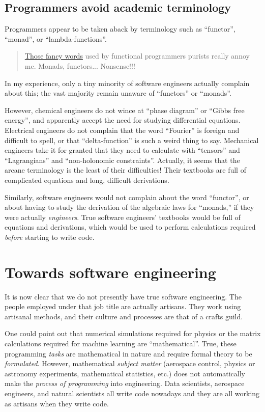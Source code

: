 \subsection{Programmers avoid academic terminology }

Programmers appear to be taken aback by terminology such as ``functor'',
``monad'', or ``lambda-functions''.
\begin{quotation}
\href{https://www.cakesolutions.net/teamblogs/those-fancy-words-monads-functors-nonsense}{Those fancy words}
used by functional programmers purists really annoy me. Monads, functors...
Nonsense!!! 
\end{quotation}
In my experience, only a tiny minority of software engineers actually
complain about this; the vast majority remain unaware of ``functors''
or ``monads''.

However, chemical engineers do not wince at ``phase diagram'' or
``Gibbs free energy'', and apparently accept the need for studying
differential equations. Electrical engineers do not complain that
the word ``Fourier'' is foreign and difficult to spell, or that
``delta-function'' is such a weird thing to say. Mechanical engineers
take it for granted that they need to calculate with ``tensors''
and ``Lagrangians'' and ``non-holonomic constraints''. Actually,
it seems that the arcane terminology is the least of their difficulties!
Their textbooks are full of complicated equations and long, difficult
derivations.

Similarly, software engineers would not complain about the word ``functor'',
or about having to study the derivation of the algebraic laws for
``monads,'' \textendash{} if they were actually \emph{engineers}.
True software engineers' textbooks would be full of equations and
derivations, which would be used to perform calculations required
\emph{before} starting to write code.

\section{Towards software engineering }

It is now clear that we do not presently have true software engineering.
The people employed under that job title are actually artisans. They
work using artisanal methods, and their culture and processes are
that of a crafts guild.

One could point out that numerical simulations required for physics
or the matrix calculations required for machine learning are ``mathematical''.
True, these programming \emph{tasks} are mathematical in nature and
require formal theory to be \emph{formulated}. However, mathematical
\emph{subject matter} (aerospace control, physics or astronomy experiments,
mathematical statistics, etc.) does not automatically make the \emph{process
of programming} into engineering. Data scientists, aerospace engineers,
and natural scientists all write code nowadays \textendash{} and they
are all working as artisans when they write code.

